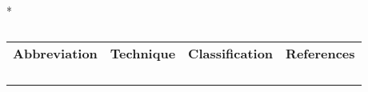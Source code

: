 \begin{table}{*}
\caption{}
\label{table:Ambient_Ionisation}

\centering 
\scriptsize

    \begin{tabular}{|c|c|c|l|}
        \hline
        \textbf{Abbreviation}  & \textbf{Technique} & \textbf{Classification} & \textbf{References} \\ 
         &  &  &  \\ 
         &  &  &  \\ 
         &  &  &  \\ 
         &  &  &  \\ 
    \end{tabular} 
\end{table}
